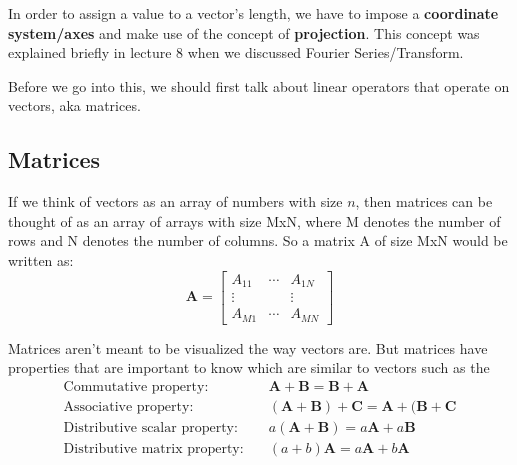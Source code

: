 \documentclass{article}
\newcommand{\be}{\begin{equation}}
\newcommand{\ee}{\end{equation}}
\begin{document}
In order to assign a value to a vector's length, we have to impose a \textbf{coordinate system/axes} and make use of the concept of \textbf{projection}.
This concept was explained briefly in lecture 8 when we discussed Fourier Series/Transform.

Before we go into this, we should first talk about linear operators that operate on vectors, aka matrices.
\subsection*{Matrices}
If we think of vectors as an array of numbers with size $n$, then matrices can be thought of as an array of arrays with size MxN, where M denotes the number of rows and N denotes the number of columns.
So a matrix A of size MxN would be written as:
\[
\textbf{A} =
\begin{bmatrix}
  A_{11} & \cdots & A_{1N} \\
  \vdots & & \vdots \\
  A_{M1} & \cdots & A_{MN}
\end{bmatrix}
\]

Matrices aren't meant to be visualized the way vectors are.
But matrices have properties that are important to know which are similar to vectors such as the
\be
  \begin{split}
    \text{Commutative property:} \quad & \textbf{A} + \textbf{B} = \textbf{B} + \textbf{A} \\
    \text{Associative property:} \quad & (\textbf{A} + \textbf{B}) + \textbf{C} = \textbf{A} + (\textbf{B} + \textbf{C} \\
    \text{Distributive scalar property:} \quad & a(\textbf{A} + \textbf{B}) = a\textbf{A} + a\textbf{B} \\
    \text{Distributive matrix property:} \quad & (a + b)\textbf{A} = a\textbf{A} + b\textbf{A} \\
  \end{split}
\ee
\end{document}

